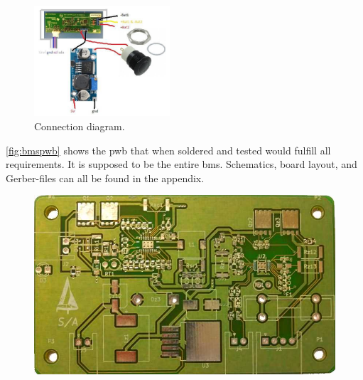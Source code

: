 \begin{figure}[H]
	\centering
	\includegraphics[width=0.45\textwidth]{Figures/diagram.jpg}
	\caption{Connection diagram.}
	\label{fig:diagram}
\end{figure} 

\autoref{fig:bmspwb} shows the \gls{pwb} that when soldered and tested would fulfill all requirements. It is supposed to be the entire \gls{bms}. 
Schematics, board layout, and Gerber-files can all be found in the appendix. %

\begin{figure}[H]
	\centering
	\includegraphics[width=.6\textwidth]{Figures/bmspwb.jpg}
	\label{fig:bmspwb}
\end{figure}
